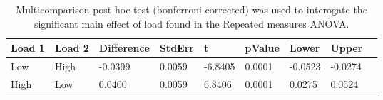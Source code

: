 \begin{table}
\centering
\begin{tabular}[0.2em]{@{}lllllllll@{}}\toprule
Load 1 & Load 2 & Difference & StdErr & t & pValue & Lower & Upper\\\toprule[0.2em]
Low & High & -0.0399 & 0.0059 & -6.8405 & 0.0001 & -0.0523 & -0.0274 \\\midrule
High & Low & 0.0400 & 0.0059 & 6.8406 & 0.0001 & 0.0275 & 0.0524 \\\bottomrule[0.2em]
\end{tabular}
\caption{Multicomparison post hoc test (bonferroni corrected) was used to interogate the significant main effect of load found in the Repeated measures ANOVA.\label{tabel:tbl_RMAAFC2_PH_load}}
\end{table}
